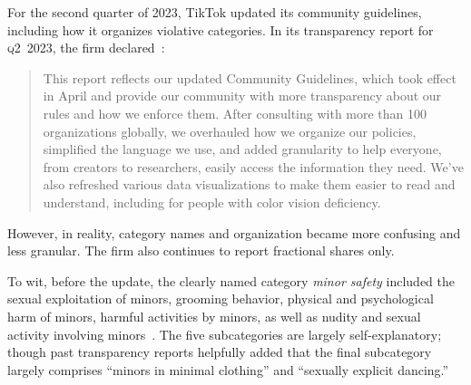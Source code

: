 \documentclass[nonacm,screen]{acmart}
\newcommand\V[1]{\textsc{\MakeLowercase{#1}}}
\begin{document}
\begin{itemize}
{For the second quarter of 2023, TikTok updated its community guidelines,
including how it organizes violative categories. In its transparency report for
\V{Q2}~2023, the firm declared~\cite{TikTok2023}:
    \begin{quote}
    This report reflects our updated Community Guidelines, which took effect in
    April and provide our community with more transparency about our rules and
    how we enforce them. After consulting with more than 100 organizations
    globally, we overhauled how we organize our policies, simplified the
    language we use, and added granularity to help everyone, from creators to
    researchers, easily access the information they need. We’ve also refreshed
    various data visualizations to make them easier to read and understand,
    including for people with color vision deficiency.
    \end{quote}
However, in reality, category names and organization became more confusing and
less granular. The firm also continues to report fractional shares only.

To wit, before the update, the clearly named category \emph{minor safety}
included the sexual exploitation of minors, grooming behavior, physical and
psychological harm of minors, harmful activities by minors, as well as nudity
and sexual activity involving minors~\cite{TikTok2023a}. The five subcategories
are largely self-explanatory; though past transparency reports helpfully added
that the final subcategory largely comprises ``minors in minimal clothing'' and
``sexually explicit dancing.''

}
\end{itemize}
\end{document}
